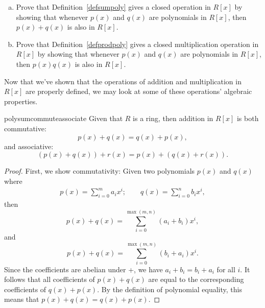 \begin{exercise}{}
\begin{enumerate}[(a)]
\item
Prove that Definition~\ref{defsumpoly} gives a closed operation in $R[x]$ by showing that whenever $p(x)$ and $q(x)$ are polynomials in $R[x]$, then $p(x)+q(x)$ is also in $R[x]$.
\item
Prove that Definition~\ref{defprodpoly} gives a  closed multiplication operation in $R[x]$ by showing that whenever $p(x)$ and $q(x)$ are polynomials in $R[x]$, then $p(x)q(x)$ is also in $R[x]$.
\end{enumerate}
\end{exercise} 

Now that we've shown that the operations of addition and multiplication in $R[x]$ are properly defined, we may look at some of these operations' algebraic properties.

\begin{prop}{polysumcommuteassociate} Given that $R$ is a ring, then addition in $R[x]$ is both commutative: 
	\[p(x)+q(x) = q(x) + p(x), \]	
and associative:	
	\[(p(x) + q(x)) + r(x)  = p(x) + (q(x) + r(x)).\]	
\end {prop}
\begin{proof}{}
First, we show commutativity:	
Given two polynomials $p(x)$ and $q(x)$ where
\begin{align*}
p(x)  = \sum^{m}_{i=0} a_i x^i; \qquad
q(x)  = \sum^{n}_{i=0} b_i x^i,
\end{align*}	
then 
\[
p(x) + q(x) =  \sum_{i=0}^{\max(m,n)} (a_i + b_i) x^i,
\]
and
\[
p(x) + q(x) =  \sum_{i=0}^{\max(m,n)} (b_i + a_i) x^i.
\]
Since the coefficients are abelian under +, we have $a_i + b_i = b_i + a_i$ for all $i$. It follows that all coefficients of $p(x) + q(x)$ are equal to the corresponding coefficients of $q(x) + p(x)$. By the definition of polynomial equality, this means that 
$p(x) + q(x) = q(x) + p(x)$.  
\end {proof}

